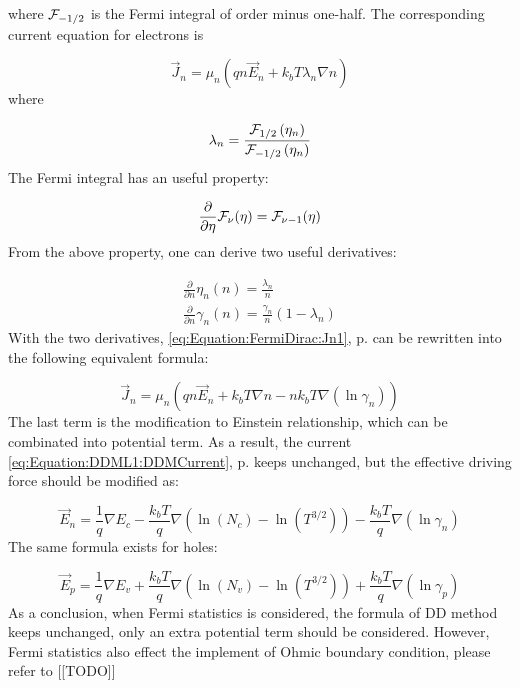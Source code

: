 \documentclass[oneside,12pt]{cgd_book}
\begin{document}
where ${\cal F}_{-1/2}$ is the Fermi integral of order minus one-half. The
      corresponding current equation for electrons is
\par
\begin{equation}
\label{eq:Equation:FermiDirac:Jn1}
\vec{J}_n = \mu_n \left( qn \vec{E}_n + k_b T \lambda_n \nabla n \right)
\end{equation}
where
\par
\begin{equation}
\lambda_n = \frac{ {\cal F}_{1/2} \left(\eta _n\right) } { {\cal F}_{-1/2} \left(\eta _n\right)
        }
\end{equation}
The Fermi integral has an useful property:
\par
\begin{equation}
\frac{\partial}{\partial \eta}{\cal F}_\nu (\eta) = {\cal F}_{\nu - 1} (\eta)
\end{equation}
From the above property, one can derive two useful derivatives:
\par
\begin{subequations}
\begin{align}
 \frac{\partial }{\partial n} \eta_n (n) = \frac{\lambda_n}{n} \\
 \frac{\partial }{\partial n} \gamma_n (n) = \frac{ \gamma _n }{n} \left( {1 - \lambda_n } \right)
\end{align}
\end{subequations}
With the two derivatives, \eqref{eq:Equation:FermiDirac:Jn1}, p. \pageref{eq:Equation:FermiDirac:Jn1}
can be rewritten into the following
      equivalent formula:
\par
\begin{equation}
\vec{J}_n = \mu_n \left( qn \vec{E}_n + k_b T\nabla n - n k_b T\nabla \left( \ln \gamma _n \right)
        \right)
\end{equation}
The last term is the modification to Einstein relationship, which can be combinated into potential term. As
      a result, the current \eqref{eq:Equation:DDML1:DDMCurrent},
p. \pageref{eq:Equation:DDML1:DDMCurrent} keeps unchanged, but the effective driving
      force should be modified as:
\par
\begin{equation}
\vec{E}_n = \frac{1}{q}\nabla E_c - \frac{k_b T}{q}\nabla \left( \ln (N_c ) - \ln (T^{3/2} ) \right)
        - \frac{ k_b T}{q}{\nabla \left( \ln \gamma _n \right)}
\end{equation}
The same formula exists for holes:
\par
\begin{equation}
\vec{E}_p = \frac{1}{q}\nabla E_v + \frac{k_b T}{q}\nabla \left( \ln (N_v ) - \ln (T^{3/2} ) \right)
        + \frac{ k_b T}{q}{\nabla \left( \ln \gamma _p \right)}
\end{equation}
As a conclusion, when Fermi statistics is considered, the formula of DD method keeps unchanged, only an
      extra potential term should be considered. However, Fermi statistics also effect the implement of Ohmic boundary
      condition, please refer to [[TODO]]
\par
\end{document}
